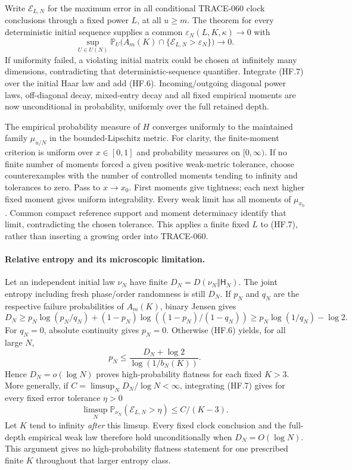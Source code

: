 Write $\mathcal E_{L,N}$ for the maximum error in all conditional
TRACE-060 clock conclusions through a fixed power $L$, at all $u\ge m$.
The theorem for every deterministic initial sequence supplies a common
$\varepsilon_N(L,K,\kappa)\to0$ with
\[
 \sup_{U\in U(N)}
 \mathbb P_U\bigl(A_m(K)\cap
       \{\mathcal E_{L,N}>\varepsilon_N\}\bigr)\longrightarrow0.  \tag{HF.7}
\]
If uniformity failed, a violating initial matrix could be chosen at
infinitely many dimensions, contradicting that deterministic-sequence
quantifier. Integrate (HF.7) over the initial Haar law and add (HF.6).
Incoming/outgoing diagonal power laws, off-diagonal decay, mixed-entry
decay and all fixed empirical moments are now unconditional in
probability, uniformly over the full retained depth.

The empirical probability measure of $H$ converges uniformly to the
maintained family $\mu_{u/N}$ in the bounded-Lipschitz metric.
For clarity, the finite-moment criterion is uniform over $x\in[0,1]$
and probability measures on $[0,\infty)$. If no finite number of
moments forced a given positive weak-metric tolerance, choose
counterexamples with the number of controlled moments tending to infinity
and tolerances to zero. Pass to $x\to x_0$. First moments give
tightness; each next higher fixed moment gives uniform integrability.
Every weak limit has all moments of $\mu_{x_0}$. Common compact
reference support and moment determinacy identify that limit,
contradicting the chosen tolerance. This applies a finite fixed $L$
to (HF.7), rather than inserting a growing order into TRACE-060.

\paragraph{Relative entropy and its microscopic limitation.}
Let an independent initial law $\nu_N$ have finite
$D_N=D(\nu_N\Vert\mathsf H_N)$. The joint entropy including fresh
phase/order randomness is still $D_N$. If $p_N$ and $q_N$ are the
respective failure probabilities of $A_m(K)$, binary Jensen gives
\[
 D_N\ge p_N\log(p_N/q_N)
       +(1-p_N)\log((1-p_N)/(1-q_N))
       \ge p_N\log(1/q_N)-\log2.
\]
For $q_N=0$, absolute continuity gives $p_N=0$.
Otherwise (HF.6) yields, for all large $N$,
\[
 p_N\le\frac{D_N+\log2}{\log(1/b_N(K))}.               \tag{HF.8}
\]
Hence $D_N=o(\log N)$ proves high-probability flatness for each
fixed $K>3$. More generally, if
$C=\limsup_N D_N/\log N<\infty$, integrating (HF.7) gives
for every fixed error tolerance $\eta>0$
\[
 \limsup_N\mathbb P_{\nu_N}(\mathcal E_{L,N}>\eta)
       \le C/(K-3).
\]
Let $K$ tend to infinity \emph{after} this limsup. Every fixed clock
conclusion and the full-depth empirical weak law therefore hold
unconditionally when $D_N=O(\log N)$. This argument gives no
high-probability flatness statement for one prescribed finite $K$
throughout that larger entropy class.

